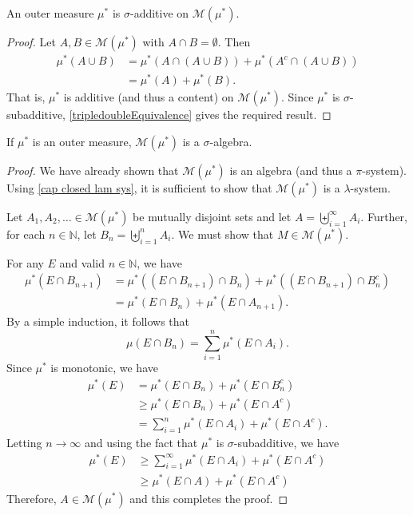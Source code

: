 \begin{lemma}
\label{outer measure is sig additive on M}
    An outer measure $\mu^*$ is $\sigma$-additive on $\mathcal{M}(\mu^*)$.
\end{lemma}
\begin{proof}
    Let $A,B\in\mathcal{M}(\mu^*)$ with $A\cap B=\emptyset$. Then
    \begin{align*}
        \mu^*(A\cup B) &= \mu^*(A\cap(A\cup B)) + \mu^*(A^c\cap(A\cup B)) \\
        &= \mu^*(A) + \mu^*(B).
    \end{align*}
    That is, $\mu^*$ is additive (and thus a content) on $\mathcal{M}(\mu^*)$. Since $\mu^*$ is $\sigma$-subadditive, \cref{tripledoubleEquivalence} gives the required result.
\end{proof}

\begin{lemma}
    If $\mu^*$ is an outer measure, $\mathcal{M}(\mu^*)$ is a $\sigma$-algebra.
\end{lemma}
\begin{proof}
    We have already shown that $\mathcal{M}(\mu^*)$ is an algebra (and thus a $\pi$-system). Using \cref{cap closed lam sys}, it is sufficient to show that $\mathcal{M}(\mu^*)$ is a $\lambda$-system.
    
    Let $A_1,A_2,\ldots\in\mathcal{M}(\mu^*)$ be mutually disjoint sets and let $A=\biguplus_{i=1}^\infty A_i$. Further, for each $n\in\mathbb{N}$, let $B_n=\biguplus_{i=1}^n A_i$. We must show that $M\in\mathcal{M}(\mu^*)$.
    
    For any $E$ and valid $n\in\mathbb{N}$, we have
    \begin{align*}
        \mu^*(E\cap B_{n+1}) &= \mu^*((E\cap B_{n+1})\cap B_n) + \mu^*((E\cap B_{n+1})\cap B_n^c) \\
        &= \mu^*(E\cap B_n) + \mu^*(E\cap A_{n+1}).
    \end{align*}
    By a simple induction, it follows that
    $$\mu(E\cap B_{n})=\sum_{i=1}^n \mu^*(E\cap A_i).$$
    Since $\mu^*$ is monotonic, we have
    \begin{align*}
        \mu^*(E) &= \mu^*(E\cap B_n) + \mu^*(E\cap B_n^c) \\
        &\geq \mu^*(E\cap B_n) + \mu^*(E\cap A^c) \\
        &= \sum_{i=1}^n\mu^*(E\cap A_i) + \mu^*(E\cap A^c).
    \end{align*}
    Letting $n\to\infty$ and using the fact that $\mu^*$ is $\sigma$-subadditive, we have
    \begin{align*}
        \mu^*(E) &\geq \sum_{i=1}^\infty\mu^*(E\cap A_i) + \mu^*(E\cap A^c) \\
        &\geq \mu^*(E\cap A) + \mu^*(E\cap A^c)
    \end{align*}
    Therefore, $A\in\mathcal{M}(\mu^*)$ and this completes the proof.
\end{proof}

